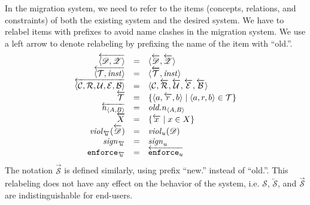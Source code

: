 \documentclass[runningheads]{llncs}
\newcommand{\id}[1]{\text{\it #1\/}}
\newcommand{\enforceC}[1]{{\tt enforce}_{#1}}
\newcommand{\instance}{\mathbin{\id{inst}}}
\newcommand{\viol}[2]{\violC{#1}(#2)}
\newcommand{\violC}[1]{\id{viol}_{#1}}
\newcommand{\sign}[1]{\id{sign}_{#1}}
\newcommand{\enfRel}[1]{\enforceC{#1}}
\newcommand{\declare}[3]{\id{#1}_{\pair{#2}{#3}}}
\newcommand{\pair}[2]{\langle{#1},{#2}\rangle}
\newcommand{\triple}[3]{\langle{#1},{#2},{#3}\rangle}
\newcommand{\quintuple}[5]{\langle{#1},{#2},{#3},{#4},{#5}\rangle}
\newcommand{\concepts}{\mathcal{C}}
\newcommand{\rels}{\mathcal{R}}   %
\newcommand{\triples}{\mathcal{T}}
\newcommand{\rules}{\mathcal{U}}
\newcommand{\transactions}{\mathcal{E}}
\newcommand{\busConstraints}{\mathcal{B}}
\newcommand{\dataset}{\mathscr{D}}
\newcommand{\schema}{\mathscr{Z}}
\newcommand{\infsys}{\mathscr{S}}
\begin{document}
   In the migration system, we need to refer to the items (concepts, relations, and constraints) of both the existing system and the desired system.
   We have to relabel items with prefixes to avoid name clashes in the migration system.
   We use a left arrow to denote relabeling by prefixing the name of the item with ``old.''.
\begin{equation}
   \begin{array}[m]{rcl}
      \overleftarrow{\pair{\dataset}{\schema}}&=&\pair{\overleftarrow{\dataset}}{\overleftarrow{\schema}}\\
      \overleftarrow{\pair{\triples}{\instance}}&=&\pair{\overleftarrow{\triples}}{\instance}\\
      \overleftarrow{\quintuple{\concepts}{\rels}{\rules}{\transactions}{\busConstraints}}&=&\quintuple{\concepts}{\overleftarrow{\rels}}{\overleftarrow{\rules}}{\overleftarrow{\transactions}}{\overleftarrow{\busConstraints}}\\
      \overleftarrow{\triples}&=&\{\triple{a}{\overleftarrow{r}}{b}\mid\triple{a}{r}{b}\in\triples\}\\
      \overleftarrow{\declare{n}{A}{B}}&=&\declare{old.n}{A}{B}\\
      \overleftarrow{X}&=&\{\overleftarrow{x}\mid x\in X\}\\
      \viol{\overleftarrow{u}}{\overleftarrow{\dataset}}&=&\viol{u}{\dataset}\\
      \sign{\overleftarrow{u}}&=&\sign{u}\\
      \enfRel{\overleftarrow{u}}&=&\overleftarrow{\enfRel{u}}
   \end{array}
\end{equation}
   The notation $\overrightarrow{\infsys}$ is defined similarly, using prefix ``new.'' instead of ``old.''.
   This relabeling does not have any effect on the behavior of the system, i.e. $\infsys$, $\overleftarrow{\infsys}$, and $\overrightarrow{\infsys}$ are indistinguishable for end-users.
\end{document}

